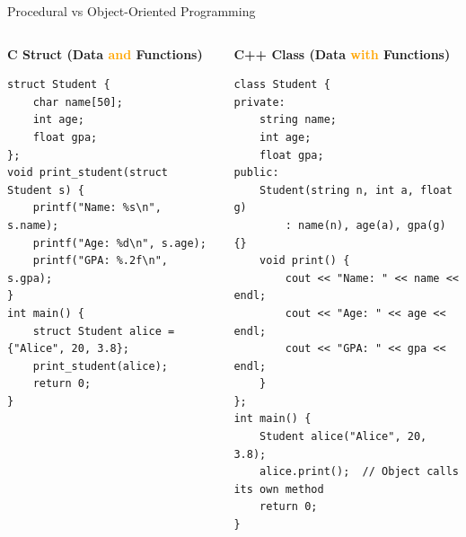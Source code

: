 \begin{frame}[fragile]{Procedural vs Object-Oriented Programming}
	\begin{columns}
		\begin{column}{0.5\textwidth}
			\textbf{C Struct (Data \textcolor{orange}{and} Functions)}
			\begin{verbatim}
struct Student {
    char name[50];
    int age;
    float gpa;
};
void print_student(struct Student s) {
    printf("Name: %s\n", s.name);
    printf("Age: %d\n", s.age);
    printf("GPA: %.2f\n", s.gpa);
}
int main() {
    struct Student alice = {"Alice", 20, 3.8};
    print_student(alice);
    return 0;
}
			\end{verbatim}
		\end{column}
		\begin{column}{0.5\textwidth}
			\textbf{C++ Class (Data \textcolor{orange}{with} Functions)}
			\begin{verbatim}
class Student {
private:
    string name;
    int age;
    float gpa;
public:
    Student(string n, int a, float g)
        : name(n), age(a), gpa(g) {}
    void print() {
        cout << "Name: " << name << endl;
        cout << "Age: " << age << endl;
        cout << "GPA: " << gpa << endl;
    }
};
int main() {
    Student alice("Alice", 20, 3.8);
    alice.print();  // Object calls its own method
    return 0;
}
			\end{verbatim}
		\end{column}
	\end{columns}
\end{frame}

